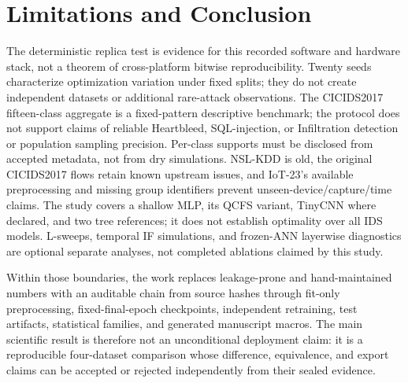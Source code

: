 \documentclass[10pt,conference]{IEEEtran}
\begin{document}
\section{Limitations and Conclusion}

The deterministic replica test is evidence for this recorded software and
hardware stack, not a theorem of cross-platform bitwise reproducibility.
Twenty seeds characterize optimization variation under fixed splits; they do
not create independent datasets or additional rare-attack observations. The
CICIDS2017 fifteen-class aggregate is a fixed-pattern descriptive benchmark;
the protocol does not support claims of reliable Heartbleed, SQL-injection,
or Infiltration detection or population sampling precision.
Per-class supports must be disclosed from accepted metadata, not from dry
simulations. NSL-KDD is old, the original CICIDS2017
flows retain known upstream issues, and IoT-23's available preprocessing and
missing group identifiers prevent unseen-device/capture/time claims. The
study covers a shallow MLP, its QCFS variant, TinyCNN where declared, and two
tree references; it does not establish optimality over all IDS models.
L-sweeps, temporal IF simulations, and frozen-ANN layerwise diagnostics are
optional separate analyses, not completed ablations claimed by this study.

Within those boundaries, the work replaces leakage-prone and hand-maintained
numbers with an auditable chain from source hashes through fit-only
preprocessing, fixed-final-epoch checkpoints, independent retraining, test artifacts,
statistical families, and generated manuscript macros. The main scientific
result is therefore not an unconditional deployment claim: it is a
reproducible four-dataset comparison whose difference, equivalence, and export
claims can be accepted or rejected independently from their sealed evidence.

\balance
{\small


}
\end{document}
